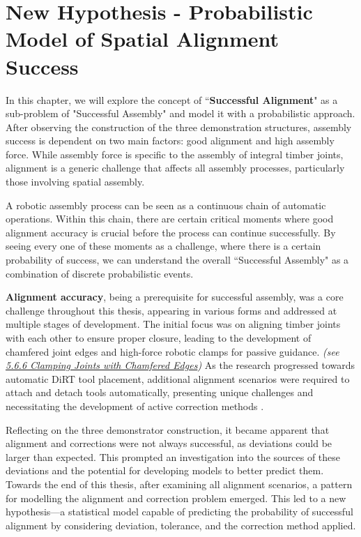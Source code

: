 \chapter{New Hypothesis - Probabilistic Model of Spatial Alignment Success}
\label{chapter:new_hypothesis}

In this chapter, we will explore the concept of ``\textbf{Successful Alignment}" as a sub-problem of "Successful Assembly" and model it with a probabilistic approach. After observing the construction of the three demonstration structures, assembly success is dependent on two main factors: good alignment and high assembly force. While assembly force is specific to the assembly of integral timber joints, alignment is a generic challenge that affects all assembly processes, particularly those involving spatial assembly.

A robotic assembly process can be seen as a continuous chain of automatic operations. Within this chain, there are certain critical moments where good alignment accuracy is crucial before the process can continue successfully. By seeing every one of these moments as a challenge, where there is a certain probability of success, we can understand the overall ``Successful Assembly" as a combination of discrete probabilistic events.

\textbf{Alignment accuracy}, being a prerequisite for successful assembly, was a core challenge throughout this thesis, appearing in various forms and addressed at multiple stages of development. The initial focus was on aligning timber joints with each other to ensure proper closure, leading to the development of chamfered joint edges and high-force robotic clamps for passive guidance. \textit{(see \ul{5.6.6 Clamping Joints with Chamfered Edges})} As the research progressed towards automatic DiRT tool placement, additional alignment scenarios were required to attach and detach tools automatically, presenting unique challenges and necessitating the development of active correction methods .

Reflecting on the three demonstrator construction, it became apparent that alignment and corrections were not always successful, as deviations could be larger than expected. This prompted an investigation into the sources of these deviations and the potential for developing models to better predict them. Towards the end of this thesis, after examining all alignment scenarios, a pattern for modelling the alignment and correction problem emerged. This led to a new hypothesis—a statistical model capable of predicting the probability of successful alignment by considering deviation, tolerance, and the correction method applied.

